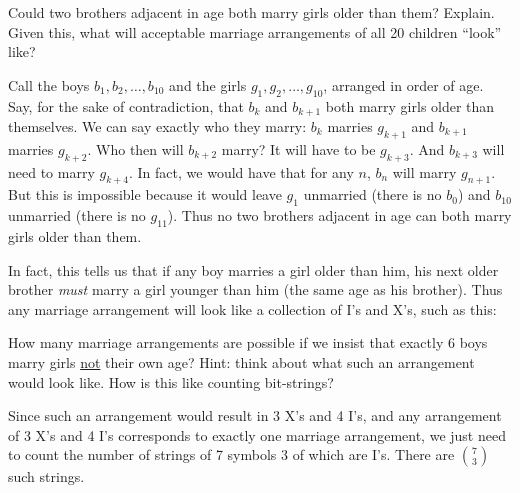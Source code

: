 \documentclass[11pt]{exam}
\newcommand{\vtx}[2]{node[fill,circle,inner sep = 0 pt, minimum size=4 pt,label=#1:#2]{}}
\renewcommand{\v}{\vtx{above}{}}
\begin{document}
\begin{questions}
\question Could two brothers adjacent in age both marry girls older than them?  Explain.  Given this, what will acceptable marriage arrangements of all 20 children ``look'' like?
\begin{solution}
Call the boys $b_1, b_2, \ldots, b_{10}$ and the girls $g_1, g_2, \ldots, g_{10}$, arranged in order of age.  Say, for the sake of contradiction, that $b_k$ and $b_{k+1}$ both marry girls older than themselves.  We can say exactly who they marry: $b_k$ marries $g_{k+1}$ and $b_{k+1}$ marries $g_{k+2}$.  Who then will $b_{k+2}$ marry?  It will have to be $g_{k+3}$.  And $b_{k+3}$ will need to marry $g_{k+4}$.  In fact, we would have that for any $n$, $b_n$ will marry $g_{n+1}$.  But this is impossible because it would leave $g_1$ unmarried (there is no $b_{0}$) and $b_{10}$ unmarried (there is no $g_{11}$).  Thus no two brothers adjacent in age can both marry girls older than them.

In fact, this tells us that if any boy marries a girl older than him, his next older brother \emph{must} marry a girl younger than him (the same age as his brother).  Thus any marriage arrangement will look like a collection of I's and X's, such as this:

\begin{center}
\end{center}
\end{solution}
\vfill

\question How many marriage arrangements are possible if we insist that exactly 6 boys marry girls \underline{not} their own age? Hint: think about what such an arrangement would look like.  How is this like counting bit-strings?

\begin{solution}
Since such an arrangement would result in 3 X's and 4 I's, and any arrangement of 3 X's and 4 I's corresponds to exactly one marriage arrangement, we just need to count the number of strings of 7 symbols 3 of which are I's.  There are ${7 \choose 3}$ such strings.
\end{solution}



\end{questions}
\end{document}
